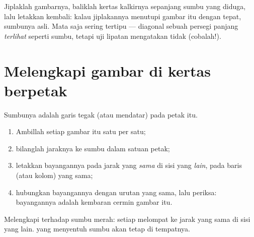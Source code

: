 \begin{example}\label{ex:g4:symmetry:trace}
Jiplaklah gambarnya, baliklah kertas kalkirnya sepanjang sumbu yang
diduga, lalu letakkan kembali: kalau jiplakannya menutupi gambar itu
dengan tepat, sumbunya asli. Mata saja sering tertipu --- diagonal
sebuah persegi panjang \emph{terlihat} seperti sumbu, tetapi uji
lipatan mengatakan tidak (cobalah!).
\end{example}

\section{Melengkapi gambar di kertas berpetak}

\begin{method}\label{met:g4:symmetry:grid}
Sumbunya adalah garis tegak (atau mendatar) pada petak itu.
\begin{enumerate}
  \item Ambillah setiap  gambar itu satu per satu;
  \item bilanglah jaraknya ke sumbu dalam satuan petak;
  \item letakkan  bayangannya pada jarak yang \emph{sama}
        di sisi yang \emph{lain}, pada baris (atau kolom) yang sama;
  \item hubungkan  bayangannya dengan urutan yang sama,
        lalu periksa: bayangannya adalah kembaran cermin gambar itu.
\end{enumerate}
\end{method}

\begin{omfigure}

{\small Melengkapi terhadap sumbu merah: setiap  melompat
ke jarak yang sama di sisi yang lain.  yang menyentuh
sumbu akan tetap di tempatnya.}
\end{omfigure}

